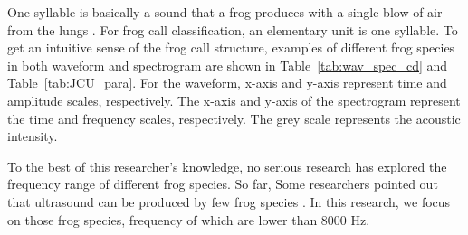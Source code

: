 One syllable is basically a sound that a frog produces with a single blow of air from the lungs \citep{huang2009frog}. For frog call classification, an elementary unit is one syllable. 
To get an intuitive sense of the frog call structure, examples of different frog species in both waveform and spectrogram are shown in Table~\ref{tab:wav_spec_cd} and Table~\ref{tab:JCU_para}. For the waveform, x-axis and y-axis represent time and amplitude scales, respectively. The x-axis and y-axis of the spectrogram represent the time and frequency scales, respectively. The grey scale represents the acoustic intensity. 


To the best of this researcher's knowledge, no serious research has explored the frequency range of different frog species. So far,   Some researchers pointed out that ultrasound can be produced by few frog species \citep{narins2007frogs, arch2008ultrasonic}. In this research, we focus on those frog species, frequency of which are lower than 8000 Hz.


